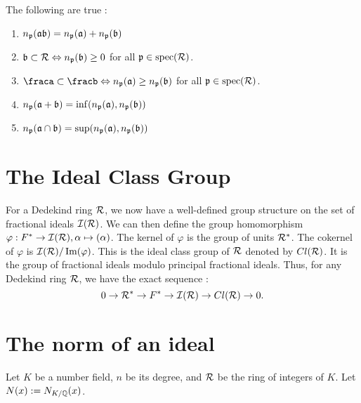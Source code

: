\begin{prop}
  The following are true :
  \begin{enumerate}
    \item $n_{\mathfrak{p}}(\mathfrak{a}\mathfrak{b}) = n_{\mathfrak{p}}(\mathfrak{a})+n_{\mathfrak{p}}(\mathfrak{b})$
    \item $\mathfrak{b} \subset \mathcal{R} \Leftrightarrow n_{\mathfrak{p}}(\mathfrak{b})\geq 0$ for all $\mathfrak{p} \in \operatorname{spec}(\mathcal{R})$.
    \item $\fraca \subset \fracb \iff n_{\frakp}(\fraka)\geq n_{\frakp}(\frakb)$ for all $\mathfrak{p} \in \operatorname{spec}(\mathcal{R})$.
    \item $n_{\mathfrak{p}}(\mathfrak{a} + \mathfrak{b}) = \inf(n_{\mathfrak{p}}(\mathfrak{a}),n_{\mathfrak{p}}(\mathfrak{b}))$
    \item $n_{\mathfrak{p}}(\mathfrak{a} \cap \mathfrak{b}) = \sup(n_{\mathfrak{p}}(\mathfrak{a}),n_{\mathfrak{p}}(\mathfrak{b}))$
  \end{enumerate}
\end{prop}

\section{The Ideal Class Group}

For a Dedekind ring $\mathcal{R}$, we now have a well-defined group structure on the set of fractional ideals $\mathcal{I}(\mathcal{R})$. We can then define the group homomorphism $\varphi : F^* \to \mathcal{I}(\mathcal{R}), \alpha \mapsto (\alpha)$.
The kernel of $\varphi$ is the group of units $\mathcal{R}^*$. The cokernel of $\varphi$ is $\mathcal{I}(\mathcal{R})/\operatorname{Im}(\varphi)$. This is the ideal class group of $\mathcal{R}$ denoted by $Cl(\mathcal{R})$. It is the group of fractional ideals modulo principal fractional ideals. Thus, for any Dedekind ring $\mathcal{R}$, we have the exact sequence :
\[0 \to \mathcal{R}^* \to F^* \to \mathcal{I}(\mathcal{R})\to Cl(\mathcal{R})\to 0.\]

\section{The norm of an ideal}

Let $K$ be a number field, $n$ be its degree, and $\mathcal{R}$ be the ring of integers of $K$. Let $N(x) := N_{K/\mathbb{Q}}(x)$.

